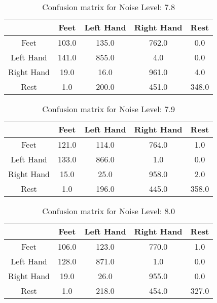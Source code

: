 \begin{table}[!htbp]
    \centering
    \begin{tabular}{|c||c|c|c|c|}
        \hline
		 & Feet & Left Hand & Right Hand & Rest \\
        \hline
        \hline
        Feet & 103.0 & 135.0 & 762.0 & 0.0 \\
        \hline
        Left Hand & 141.0 & 855.0 & 4.0 & 0.0 \\
        \hline
        Right Hand & 19.0 & 16.0 & 961.0 & 4.0 \\
        \hline
        Rest & 1.0 & 200.0 & 451.0 & 348.0 \\
        \hline
    \end{tabular}
    \caption{Confusion matrix for Noise Level: 7.8}
\end{table}

\begin{table}[!htbp]
    \centering
    \begin{tabular}{|c||c|c|c|c|}
        \hline
		 & Feet & Left Hand & Right Hand & Rest \\
        \hline
        \hline
        Feet & 121.0 & 114.0 & 764.0 & 1.0 \\
        \hline
        Left Hand & 133.0 & 866.0 & 1.0 & 0.0 \\
        \hline
        Right Hand & 15.0 & 25.0 & 958.0 & 2.0 \\
        \hline
        Rest & 1.0 & 196.0 & 445.0 & 358.0 \\
        \hline
    \end{tabular}
    \caption{Confusion matrix for Noise Level: 7.9}
\end{table}

\begin{table}[!htbp]
    \centering
    \begin{tabular}{|c||c|c|c|c|}
        \hline
		 & Feet & Left Hand & Right Hand & Rest \\
        \hline
        \hline
        Feet & 106.0 & 123.0 & 770.0 & 1.0 \\
        \hline
        Left Hand & 128.0 & 871.0 & 1.0 & 0.0 \\
        \hline
        Right Hand & 19.0 & 26.0 & 955.0 & 0.0 \\
        \hline
        Rest & 1.0 & 218.0 & 454.0 & 327.0 \\
        \hline
    \end{tabular}
    \caption{Confusion matrix for Noise Level: 8.0}
\end{table}

